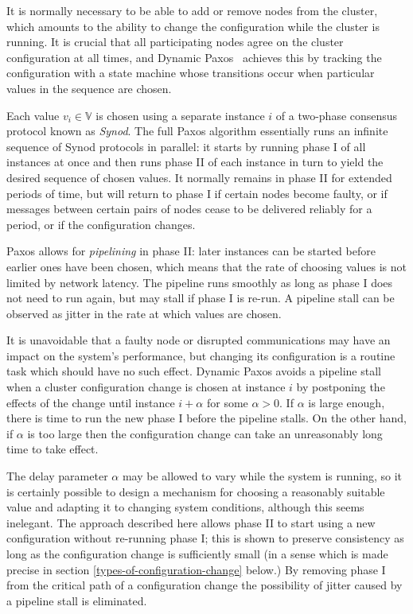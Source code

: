 \documentclass[journal]{IEEEtran}
\begin{document}
It is normally necessary to be able to add or remove nodes from the cluster,
which amounts to the ability to change the configuration while the cluster is
running. It is crucial that all participating nodes agree on the cluster
configuration at all times, and Dynamic Paxos~\cite{cheap-paxos} achieves this
by tracking the configuration with a state machine whose transitions occur when
particular values in the sequence are chosen.

Each value $v_i \in \mathbb V$ is chosen using a separate instance $i$ of a
two-phase consensus protocol known as \textit{Synod}. The full Paxos algorithm
essentially runs an infinite sequence of Synod protocols in parallel: it starts
by running phase I of all instances at once and then runs phase II of each
instance in turn to yield the desired sequence of chosen values. It normally
remains in phase II for extended periods of time, but will return to phase I if
certain nodes become faulty, or if messages between certain pairs of nodes
cease to be delivered reliably for a period, or if the configuration changes.

Paxos allows for \textit{pipelining} \cite{smart} in phase II: later instances
can be started before earlier ones have been chosen, which means that the rate
of choosing values is not limited by network latency. The pipeline runs
smoothly as long as phase I does not need to run again, but may stall if phase
I is re-run. A pipeline stall can be observed as jitter in the rate at which
values are chosen.

It is unavoidable that a faulty node or disrupted communications may have an
impact on the system's performance, but changing its configuration is a routine
task which should have no such effect. Dynamic Paxos avoids a pipeline stall
when a cluster configuration change is chosen at instance $i$ by postponing the
effects of the change until instance $i + \alpha$ for some $\alpha > 0$. If
$\alpha$ is large enough, there is time to run the new phase I before the
pipeline stalls.  On the other hand, if $\alpha$ is too large then the
configuration change can take an unreasonably long time to take effect.

The delay parameter $\alpha$ may be allowed to vary while the system is
running, so it is certainly possible to design a mechanism for choosing a
reasonably suitable value and adapting it to changing system conditions,
although this seems inelegant\cite{reconfiguring-a-state-machine}.  The
approach described here allows phase II to start using a new configuration
without re-running phase I; this is shown to preserve consistency as long as
the configuration change is sufficiently small (in a sense which is made
precise in section \ref{types-of-configuration-change} below.) By removing
phase I from the critical path of a configuration change the possibility of
jitter caused by a pipeline stall is eliminated.
\end{document}
